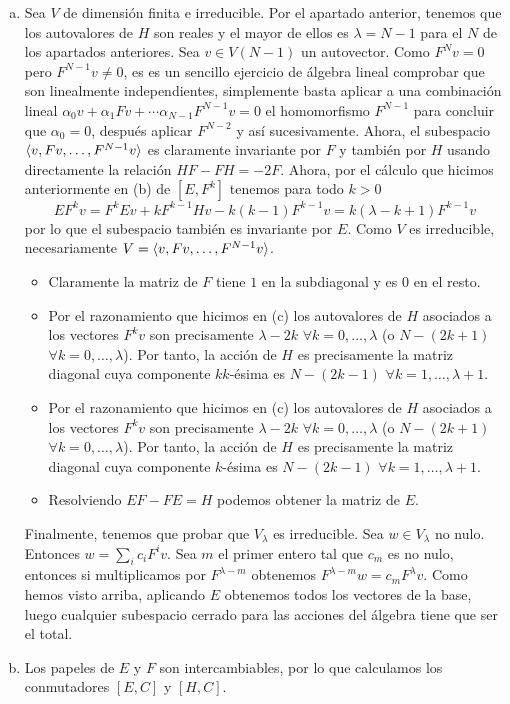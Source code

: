 \documentclass[twoside]{article}
\begin{document}
\begin{solucion}
\begin{enumerate}[(a)]
\item Sea $V$ de dimensión finita e irreducible. Por el apartado anterior, tenemos que los autovalores de $H$ son reales y el mayor de ellos es $\lambda=N-1$ para el $N$ de los apartados anteriores. Sea $v\in V(N-1)$ un autovector. Como $F^Nv=0$ pero $F^{N-1}v\neq 0$, es es un sencillo ejercicio de álgebra lineal comprobar que son linealmente independientes, simplemente basta aplicar a una combinación lineal $\alpha_0v+\alpha_1Fv+\cdots \alpha_{N-1}F^{N-1}v=0$ el homomorfismo $F^{N-1}$ para concluir que $\alpha_0=0$, después aplicar $F^{N-2}$ y así sucesivamente. Ahora, el subespacio $\langle{v, Fv,\dots, F^{N-1}v}\rangle$ es claramente invariante por $F$ y también por $H$ usando directamente la relación $HF-FH=-2F$. Ahora, por el cálculo que hicimos anteriormente en (b) de $[E,F^k]$ tenemos para todo $k>0$
\[
EF^k v = F^k Ev + kF^{k-1}Hv -k(k-1)F^{k-1}v = k(\lambda-k+1) F^{k-1}v
\]
por lo que el subespacio también es invariante por $E$. Como $V$ es irreducible, necesariamente $V=\langle{v, Fv,\dots, F^{N-1}v}\rangle$. 
\begin{itemize}
\item Claramente la matriz de $F$ tiene $1$ en la subdiagonal y es $0$ en el resto.
\item Por el razonamiento que hicimos en (c) los autovalores de $H$ asociados a los vectores $F^kv$ son precisamente $\lambda-2k$ $\forall k =0,\dotsc,\lambda$ (o $N - (2k+1)$ $\forall k=0,\dotsc,\lambda$). Por tanto, la acción de $H$ es precisamente la matriz diagonal cuya componente $kk$-ésima es $N-(2k-1)$ $\forall k=1,\dotsc,\lambda+1$.
\item Por el razonamiento que hicimos en (c) los autovalores de $H$ asociados a los vectores $F^kv$ son precisamente $\lambda-2k$ $\forall k =0,\dotsc,\lambda$ (o $N - (2k+1)$ $\forall k=0,\dotsc,\lambda$). Por tanto, la acción de $H$ es precisamente la matriz diagonal cuya componente $k$-ésima es $N-(2k-1)$ $\forall k=1,\dotsc,\lambda+1$.
\item Resolviendo $EF-FE =H$ podemos obtener la matriz de $E$. 
\end{itemize}
Finalmente, tenemos que probar que $V_\lambda$ es irreducible. Sea $w\in V_\lambda$ no nulo. Entonces $w=\sum_i c_iF^iv$. Sea $m$ el primer entero tal que $c_m$ es no nulo, entonces si multiplicamos por $F^{\lambda-m}$ obtenemos $F^{\lambda-m}w = c_m F^\lambda v$. Como hemos visto arriba, aplicando $E$ obtenemos todos los vectores de la base, luego cualquier subespacio cerrado para las acciones del álgebra tiene que ser el total.
\item Los papeles de $E$ y $F$ son intercambiables, por lo que calculamos los conmutadores $[E,C]$ y $[H,C]$. 

\end{enumerate}
\end{solucion}
\end{document}
